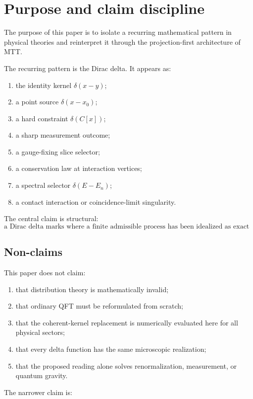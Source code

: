 \documentclass[11pt]{article}
\begin{document}
\tableofcontents

\section{Purpose and claim discipline}

The purpose of this paper is to isolate a recurring mathematical pattern in physical
theories and reinterpret it through the projection-first architecture of MTT.

The recurring pattern is the Dirac delta. It appears as:
\begin{enumerate}
\item the identity kernel \(\delta(x-y)\);
\item a point source \(\delta(x-x_0)\);
\item a hard constraint \(\delta(C[x])\);
\item a sharp measurement outcome;
\item a gauge-fixing slice selector;
\item a conservation law at interaction vertices;
\item a spectral selector \(\delta(E-E_n)\);
\item a contact interaction or coincidence-limit singularity.
\end{enumerate}

The central claim is structural:
\[
\boxed{\text{a Dirac delta marks where a finite admissible process has been
idealized as exact zero-width selection.}}
\]

\subsection{Non-claims}

This paper does not claim:
\begin{enumerate}
\item that distribution theory is mathematically invalid;
\item that ordinary QFT must be reformulated from scratch;
\item that the coherent-kernel replacement is numerically evaluated here for all physical sectors;
\item that every delta function has the same microscopic realization;
\item that the proposed reading alone solves renormalization, measurement, or quantum gravity.
\end{enumerate}

The narrower claim is:
\end{document}
